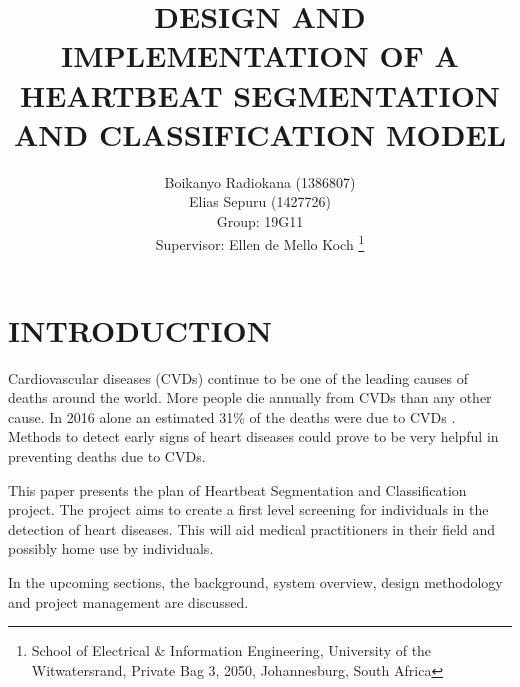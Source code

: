 \documentclass[10pt,twocolumn]{witseiepaper}
\begin{document}
\title{DESIGN AND IMPLEMENTATION OF A HEARTBEAT SEGMENTATION AND CLASSIFICATION MODEL}

\author{Boikanyo Radiokana (1386807) \\ Elias Sepuru (1427726) \\ Group: 19G11 \\ Supervisor: Ellen de Mello Koch
\thanks{School of Electrical \& Information Engineering, University of the
Witwatersrand, Private Bag 3, 2050, Johannesburg, South Africa}
}


%



\maketitle
\thispagestyle{empty}\pagestyle{empty}


%
\section{INTRODUCTION}
Cardiovascular diseases (CVDs) continue to be one of the leading causes of deaths around the world. More people die annually from CVDs than  any other cause. In 2016 alone an estimated 31\% of the deaths were due to CVDs \cite{WHO}. Methods to detect early signs of heart diseases could prove to be very helpful in preventing deaths due to CVDs. 

This paper presents the plan of Heartbeat Segmentation and Classification project. The project aims to create a first level screening for individuals in the detection of heart diseases. This will aid medical practitioners in their field and possibly home use by individuals.

In the upcoming sections, the background, system overview, design methodology and project management are discussed.
\end{document}
